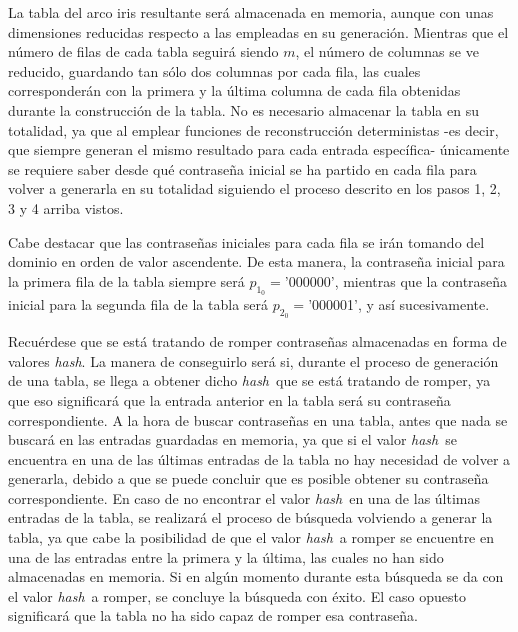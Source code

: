 \documentclass[12pt,spanish,listoffigures,listoftables,listofalgorithms]{tfgetsinf}
\newcommand{\hash}{\textit{hash}}
\begin{document}
La tabla del arco iris resultante será almacenada en memoria, aunque con unas dimensiones reducidas respecto a las empleadas en su generación. Mientras que el número de filas de cada tabla seguirá siendo $m$, el número de columnas se ve reducido, guardando tan sólo dos columnas por cada fila, las cuales corresponderán con la primera y la última columna de cada fila obtenidas durante la construcción de la tabla. No es necesario almacenar la tabla en su totalidad, ya que al emplear funciones de reconstrucción deterministas -es decir, que siempre generan el mismo resultado para cada entrada específica- únicamente se requiere saber desde qué contraseña inicial se ha partido en cada fila para volver a generarla en su totalidad siguiendo el proceso descrito en los pasos 1, 2, 3 y 4 arriba vistos.

Cabe destacar que las contraseñas iniciales para cada fila se irán tomando del dominio en orden de valor ascendente. De esta manera, la contraseña inicial para la primera fila de la tabla siempre será $p_{1_0} = $'000000', mientras que la contraseña inicial para la segunda fila de la tabla será $p_{2_0} = $'000001', y así sucesivamente.

Recuérdese que se está tratando de romper contraseñas almacenadas en forma de valores \hash. La manera de conseguirlo será si, durante el proceso de generación de una tabla, se llega a obtener dicho \hash~que se está tratando de romper, ya que eso significará que la entrada anterior en la tabla será su contraseña correspondiente. A la hora de buscar contraseñas en una tabla, antes que nada se buscará en las entradas guardadas en memoria, ya que si el valor \hash~se encuentra en una de las últimas entradas de la tabla no hay necesidad de volver a generarla, debido a que se puede concluir que es posible obtener su contraseña correspondiente. En caso de no encontrar el valor \hash~en una de las últimas entradas de la tabla, se realizará el proceso de búsqueda volviendo a generar la tabla, ya que cabe la posibilidad de que el valor \hash~a romper se encuentre en una de las entradas entre la primera y la última, las cuales no han sido almacenadas en memoria. Si en algún momento durante esta búsqueda se da con el valor \hash~a romper, se concluye la búsqueda con éxito. El caso opuesto significará que la tabla no ha sido capaz de romper esa contraseña.
\end{document}
